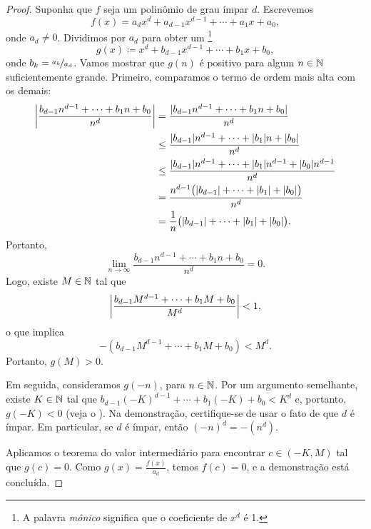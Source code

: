 \begin{proof}
Suponha que $f$ seja um polinômio de grau ímpar $d$. Escrevemos
\begin{equation*}
f(x) = a_d x^d + a_{d-1} x^{d-1} + \cdots + a_1 x + a_0 ,
\end{equation*}
onde $a_d \neq 0$. Dividimos por $a_d$ para obter um
\emph{}\footnote{A palavra \emph{mônico} significa que
o coeficiente de $x^d$ é 1.}
\begin{equation*}
g(x) \coloneqq x^d + b_{d-1} x^{d-1} + \cdots + b_1 x + b_0 ,
\end{equation*}
onde $b_k = \nicefrac{a_k}{a_d}$.
Vamos mostrar que $g(n)$ é positivo para algum $n \in {\mathbb{N}}$ suficientemente
grande. Primeiro, comparamos o termo de ordem mais alta com os demais:
\begin{equation*}
\begin{split}
\left\lvert {\frac{b_{d-1} n^{d-1} + \cdots + b_1 n + b_0}{n^d}} \right\rvert
& =
\frac{\lvert {b_{d-1} n^{d-1} + \cdots + b_1 n + b_0} \rvert}{n^d}
\\
& \leq
\frac{\lvert {b_{d-1}} \rvert n^{d-1} + \cdots + \lvert {b_1} \rvert n + \lvert {b_0} \rvert}{n^d}
\\
& \leq
\frac{\lvert {b_{d-1}} \rvert n^{d-1} + \cdots + \lvert {b_1} \rvert n^{d-1} + \lvert {b_0} \rvert n^{d-1}}{n^d}
\\
& =
\frac{n^{d-1}\bigl(\lvert {b_{d-1}} \rvert + \cdots + \lvert {b_1} \rvert + \lvert {b_0} \rvert\bigr)}{n^d}
\\
& =
\frac{1}{n}
\bigl(\lvert {b_{d-1}} \rvert + \cdots + \lvert {b_1} \rvert + \lvert {b_0} \rvert\bigr) .
\end{split}
\end{equation*}
Portanto,
\begin{equation*}
\lim_{n\to\infty} \frac{b_{d-1} n^{d-1} + \cdots + b_1 n + b_0}{n^d}
= 0 .
\end{equation*}
Logo, existe $M \in {\mathbb{N}}$ tal que
\begin{equation*}
\left\lvert {\frac{b_{d-1} M^{d-1} + \cdots + b_1 M + b_0}{M^d}} \right\rvert < 1 ,
\end{equation*}
o que implica
\begin{equation*}
-(b_{d-1} M^{d-1} + \cdots + b_1 M + b_0) < M^d .
\end{equation*}
Portanto, $g(M) > 0$.

Em seguida, consideramos $g(-n)$, para $n \in {\mathbb{N}}$. Por um argumento
semelhante, existe $K \in {\mathbb{N}}$ tal que
$b_{d-1} {(-K)}^{d-1} + \cdots + b_1 (-K) + b_0 < K^d$
e, portanto, $g(-K) < 0$ (veja o ).
Na demonstração, certifique-se de usar o fato de que $d$ é ímpar.
Em particular, se $d$ é ímpar, então ${(-n)}^d = -(n^d)$.

Aplicamos o teorema do valor intermediário para encontrar
$c \in (-K,M)$ tal que $g(c) = 0$. Como $g(x) = \frac{f(x)}{a_d}$,
temos $f(c) = 0$, e a demonstração está concluída.
\end{proof}

